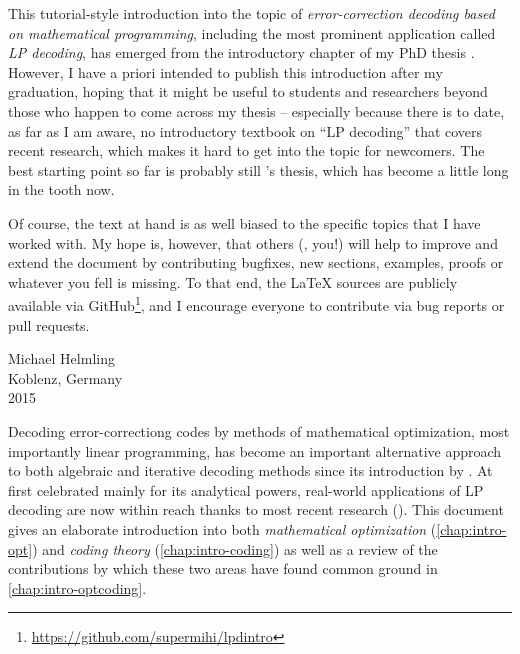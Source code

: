 \documentclass[
  paper=a4,
  parskip=half,
  english,
  fontsize=11pt,
  BCOR=1mm,
  DIV=10,
  twoside=true,
  toc=bib,
  numbers=noendperiod
]{scrbook}
\title{\mytitle}
\subtitle{A tutorial}
\author{\myauthor}
\theoremstyle{change}
\theoremstyle{nonumberplain}
\begin{document}
\maketitle
\tableofcontents

This tutorial-style introduction into the topic of \emph{error-correction decoding based on mathematical programming}, including the most prominent application called \emph{LP decoding}, has emerged from the introductory chapter of my PhD thesis \cite{Helmling15PhD}. However, I have a priori intended to publish this introduction after my graduation, hoping that it might be useful to students and researchers beyond those who happen to come across my thesis – especially because there is to date, as far as I am aware, no introductory textbook on \enquote{LP decoding} that covers recent research, which makes it hard to get into the topic for newcomers. The best starting point so far is probably still \citeauthor{Feldman03PhD}'s thesis, which has become a little long in the tooth now.

Of course, the text at hand is as well biased to the specific topics that I have worked with. My hope is, however, that others (\ie, you!) will help to improve and extend the document by contributing bugfixes, new sections, examples, proofs or whatever you fell is missing. To that end, the \LaTeX{} sources are publicly available via GitHub\footnote{\url{https://github.com/supermihi/lpdintro}}, and I encourage everyone to contribute via bug reports or pull requests.
\begin{FlushRight}
  Michael Helmling\\
  Koblenz, Germany\\
  2015
\end{FlushRight}

Decoding error-correctiong codes by methods of mathematical optimization, most importantly linear programming, has become an important alternative approach to both algebraic and iterative decoding methods since its introduction by \textcite{Feldman+05LPDecoding}. At first celebrated mainly for its analytical powers, real-world applications of LP decoding are now within reach thanks to most recent research (\cite{Liu+12PenalizedLPD, Gensheimer+14SimplexHard}). This document gives an elaborate introduction into both \emph{mathematical optimization} (\cref{chap:intro-opt}) and \emph{coding theory} (\cref{chap:intro-coding}) as well as a review of the contributions by which these two areas have found common ground in \cref{chap:intro-optcoding}.
\end{document}
